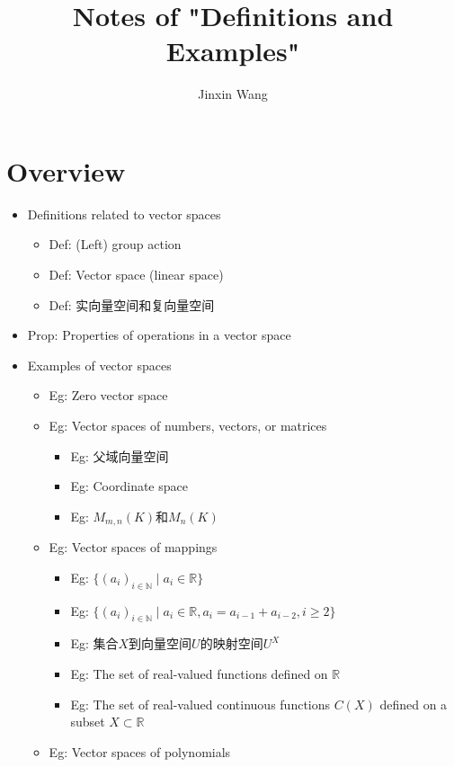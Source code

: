 \documentclass[onecolumn]{ctexart}
\title{Notes of "Definitions and Examples"}
\author{Jinxin Wang}
\date{}
\begin{document}
\maketitle

\section{Overview}
\begin{itemize}
  \item Definitions related to vector spaces
  \begin{itemize}
    \item Def: (Left) group action
    \item Def: Vector space (linear space)
    \item Def: 实向量空间和复向量空间
  \end{itemize}
  \item Prop: Properties of operations in a vector space
  \item Examples of vector spaces
  \begin{itemize}
    \item Eg: Zero vector space
    \item Eg: Vector spaces of numbers, vectors, or matrices
    \begin{itemize}
      \item Eg: 父域向量空间
      \item Eg: Coordinate space
      \item Eg: $M_{m,n}(K)$和$M_{n}(K)$
    \end{itemize}
    \item Eg: Vector spaces of mappings
    \begin{itemize}
      \item Eg: $\lbrace (a_i)_{i \in \mathbb{N}} \mid a_i \in \mathbb{R} \rbrace$
      \item Eg: $\lbrace (a_i)_{i \in \mathbb{N}} \mid a_i \in \mathbb{R}, a_i = a_{i-1} + a_{i-2}, i \geq 2 \rbrace$
      \item Eg: 集合$X$到向量空间$U$的映射空间$U^X$
      \item Eg: The set of real-valued functions defined on $\mathbb{R}$
      \item Eg: The set of real-valued continuous functions $C(X)$ defined on a subset $X \subset \mathbb{R}$
    \end{itemize}
    \item Eg: Vector spaces of polynomials
    \begin{itemize}

\end{itemize}
\end{itemize}
\end{itemize}
\end{document}
